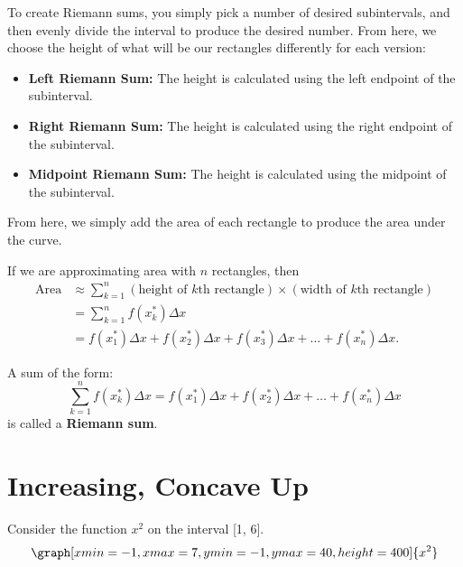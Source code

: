\documentclass{ximera}
\begin{document}
To create Riemann sums, you simply pick a number of desired subintervals, and then evenly divide the interval to produce the desired number. From here, we choose the height of what will be our rectangles differently for each version:
\begin{itemize}
\item{\textbf{Left Riemann Sum:} The height is calculated using the left endpoint of the subinterval.}
\item{\textbf{Right Riemann Sum:} The height is calculated using the right endpoint of the subinterval.}
\item{\textbf{Midpoint Riemann Sum:} The height is calculated using the midpoint of the subinterval.}
\end{itemize}

From here, we simply add the area of each rectangle to produce the area under the curve.

If we are approximating area with $n$ rectangles, then
\begin{align*}
  \text{Area} &\approx \sum_{k=1}^n (\text{height of $k$th rectangle})\times(\text{width of $k$th rectangle}) \\
  &=\sum_{k=1}^n  f(x_k^*)\Delta x \\
  &=  f(x_1^*)\Delta x +  f(x_2^*)\Delta x +   f(x_3^*)\Delta x + \dots +   f(x_n^*)\Delta x.
\end{align*}
\begin{definition}
  A sum of the form:
  \[
  \sum_{k=1}^n  f(x_k^*)\Delta x  = f(x_1^*)\Delta x +  f(x_2^*)\Delta x + \dots +   f(x_n^*)\Delta x
  \]
  is called a \textbf{Riemann sum}.
\end{definition}

\section{Increasing, Concave Up}
Consider the function $x^2$ on the interval [1, 6].
\[
\graph[xmin=-1,xmax=7,ymin=-1,ymax=40,height=400]{x^2}
\]
\end{document}
